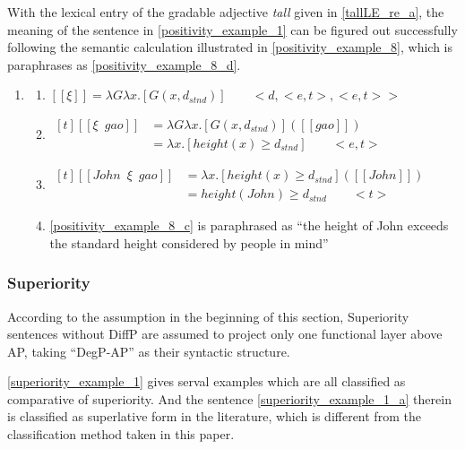 \documentclass{ctexart}
\begin{document}
With the lexical entry of the gradable adjective \textit{tall} given in \ref{tallLE_re_a}, the meaning of the sentence in \ref{positivity_example_1} can be figured out successfully following the semantic calculation illustrated in \ref{positivity_example_8}, which is paraphrases as \ref{positivity_example_8_d}.

\begin{enumerate}
    \item \label{positivity_example_8}
    \begin{enumerate}
        \item \label{positivity_example_8_a}
        $[\![\xi]\!]=\lambda G \lambda x. [G(x,d_{stnd})] \qquad <d,<e,t>,<e,t>>$

        \item \label{positivity_example_8_b}
        $\begin{aligned}[t]
            [\![\xi \enspace gao]\!] &= \lambda G \lambda x. [G(x,d_{stnd})]([\![gao]\!]) \\
            &= \lambda x.[height(x) \geq d_{stnd}] \qquad <e,t>
        \end{aligned}$

        \item \label{positivity_example_8_c}
        $\begin{aligned}[t]
            [\![John \enspace \xi \enspace gao]\!] &= \lambda x.[height(x) \geq d_{stnd}]([\![John]\!]) \\
            &= height(John) \geq d_{stnd} \qquad <t>
        \end{aligned}$

        \item \label{positivity_example_8_d}
        \ref{positivity_example_8_c} is paraphrased as ``the height of John exceeds the standard height considered by people in mind''

    \end{enumerate}
\end{enumerate}


\subsubsection{Superiority}

\noindent
According to the assumption in the beginning of this section, Superiority sentences without DiffP are assumed to project only one functional layer above AP, taking ``DegP-AP'' as their syntactic structure.

\ref{superiority_example_1} gives serval examples which are all classified as comparative of superiority. And the sentence \ref{superiority_example_1_a} therein is classified as superlative form in the literature, which is different from the classification method taken in this paper.
\end{document}
